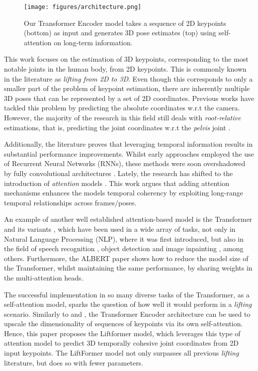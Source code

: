 \documentclass[letterpaper]{article}
\begin{document}
\begin{figure}[t]
    \centering
    \texttt{[image: figures/architecture.png]}
    \caption{Our Transformer Encoder model takes a sequence of 2D keypoints (bottom) as input and generates 3D pose estimates (top) using self-attention on long-term information.}
    \label{fig:architecture}
\end{figure}

This work focuses on the estimation of 3D keypoints, corresponding to the most notable joints in the human body, from 2D keypoints. This is commonly known in the literature as \textit{lifting from 2D to 3D}. Even though this corresponds to only a smaller part of the problem of keypoint estimation, there are inherently multiple 3D poses that can be represented by a set of 2D coordinates. Previous works \cite{moon19, chang20} have tackled this problem by predicting the absolute coordinates w.r.t the camera. However, the majority of the research in this field  still deals with \textit{root-relative} estimations, that is, predicting the joint coordinates w.r.t the \textit{pelvis} joint \cite{martinez17, hossain18, lee18, dabral18, zhao19, pavllo19, liu20}.  

Additionally, the literature proves that leveraging temporal information results in substantial performance improvements. Whilst early approaches employed the use of Recurrent Neural Networks (RNNs), these methods were soon overshadowed by fully convolutional architectures \cite{pavllo19, cheng19, cheng20}. Lately, the research has shifted to the introduction of \textit{attention} models \cite{liu20}. This work argues that adding attention mechanisms enhances the models temporal coherency by exploiting long-range temporal relationships across frames/poses. 

An example of another well established attention-based model is the Transformer \cite{vaswani17} and its variants \cite{dai19} \cite{nitaev20}, which have been used in a wide array of tasks, not only in Natural Language Processing (NLP), where it was first introduced, but also in the field of speech recognition \cite{zhang20}, object detection \cite{carion20} and image inpainting \cite{chen20}, among others. Furthermore, the ALBERT paper \cite{lan19} shows how to reduce the model size of the Transformer, whilst maintaining the same performance, by sharing weights in the multi-attention heads.

The successful implementation in so many diverse tasks of the Transformer, as a self-attention model, sparks the question of how well it would perform in a \textit{lifting} scenario. Similarly to \cite{pavllo19} and \cite{liu20}, the Transformer Encoder architecture can be used to upscale the dimensionality of sequences of keypoints via its own self-attention. Hence, this paper proposes the Liftformer model, which leverages this type of attention model to predict 3D temporally cohesive joint coordinates from 2D input keypoints. The LiftFormer model not only surpasses all previous \textit{lifting} literature, but does so with fewer parameters.
\end{document}
